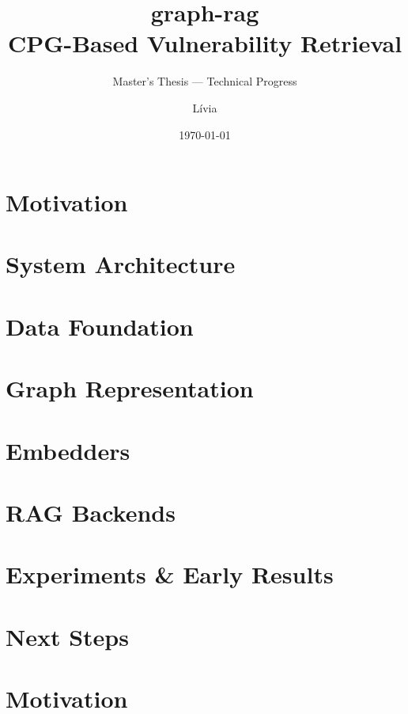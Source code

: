\documentclass[aspectratio=169,10pt]{beamer}
\title{\textbf{graph-rag}\\[4pt]
       \large CPG-Based Vulnerability Retrieval}
\subtitle{Master's Thesis — Technical Progress}
\author{Lívia}
\institute{TU Munich · Siemens AI Engineering}
\date{\today}
\begin{document}
\begin{frame}
\titlepage
\end{frame}


\section{Motivation}
\section{System Architecture}
\section{Data Foundation}
\section{Graph Representation}
\section{Embedders}
\section{RAG Backends}
\section{Experiments \& Early Results}
\section{Next Steps}

\section{Motivation}
\end{document}
